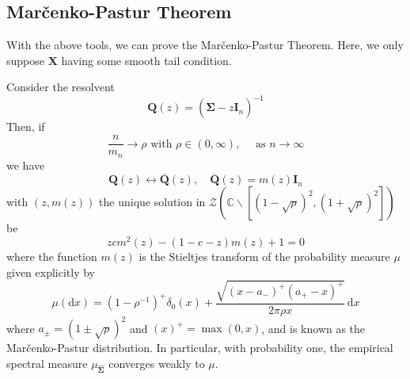 \subsection*{Marčenko-Pastur Theorem}

With the above tools, we can prove the Marčenko-Pastur Theorem. Here, we only suppose $\mathbf{X}$ having some smooth tail condition.
\begin{theorem}
    Consider the resolvent
    \begin{equation*}
        \mathbf{Q}(z)=\left(\widehat{\boldsymbol{\Sigma}}-z\mathbf{I}_{n}\right)^{-1}
    \end{equation*}
    Then, if
    \begin{equation*}
        \frac{n}{m_{n}}\rightarrow\rho\text{ with }\rho\in(0,\infty),\quad\text{ as }n\rightarrow\infty
    \end{equation*}
    we have
    \begin{equation*}
        \mathbf{Q}(z)\leftrightarrow\overline{\mathbf{Q}}(z),\quad\overline{\mathbf{Q}}(z)=m(z)\mathbf{I}_{n}
    \end{equation*}
    with $(z,m(z))$ the unique solution in $\mathcal{Z}\left(\mathbb{C}\backslash\left[(1-\sqrt{\rho})^{2},(1+\sqrt{\rho})^{2}\right]\right)$ be
    \begin{equation*}
        zcm^{2}(z)-(1-c-z)m(z)+1=0
    \end{equation*}
    where the function $m(z)$ is the Stieltjes transform of the probability measure $\mu$ given explicitly by
    \begin{equation*}
        \mu(\mathrm{d}x)=\left(1-\rho^{-1}\right)^{+}\delta_{0}(x)+\frac{\sqrt{\left(x-a_{-}\right)^{+}\left(a_{+}-x\right)^{+}}}{2\pi\rho x}\,\mathrm{d}x
    \end{equation*}
    where $a_{\pm}=(1 \pm \sqrt{\rho})^{2}$ and $(x)^{+}=\max (0, x)$, and is known as the Marčenko-Pastur distribution. In particular, with probability one, the empirical spectral measure $\mu_{\widehat{\boldsymbol{\Sigma}}}$ converges weakly to $\mu $.
\end{theorem}

